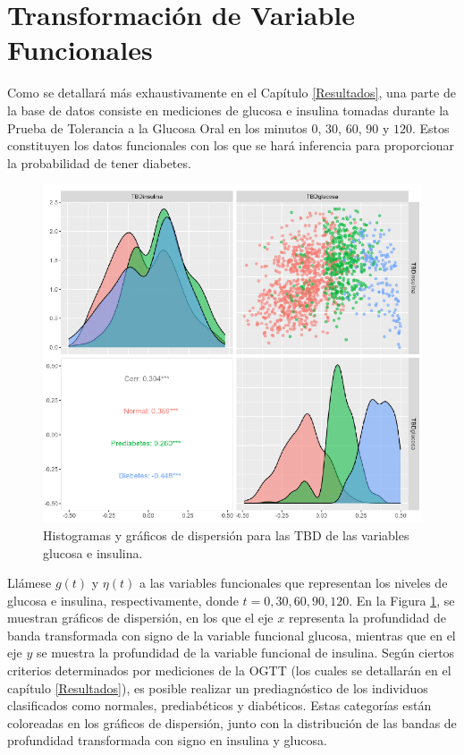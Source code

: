
\section{Transformación de Variable Funcionales}

Como se detallará más exhaustivamente en el Capítulo \ref{Resultados}, una parte de la base de datos consiste en mediciones de glucosa e insulina tomadas durante la Prueba de Tolerancia a la Glucosa Oral en los minutos $0$, $30$, $60$, $90$ y $120$. Estos constituyen los datos funcionales con los que se hará inferencia para proporcionar la probabilidad de tener diabetes. 

\begin{figure}[H]
    \centering
    \includegraphics[width = 0.7 \textwidth]{Imagenes/pairsTBDS.png}
    \caption{Histogramas y gráficos de dispersión para las TBD de las variables glucosa e insulina.}
    \label{fig:pairsTBD}
\end{figure}

Llámese $g(t)$ y $\eta(t)$ a las variables funcionales que representan los niveles de glucosa e insulina, respectivamente, donde $t = 0, 30, 60, 90, 120$. En la Figura \ref{fig:pairsTBD}, se muestran gráficos de dispersión, en los que el eje $x$ representa la profundidad de banda transformada con signo de la variable funcional glucosa, mientras que en el eje $y$ se muestra la profundidad de la variable funcional de insulina. Según ciertos criterios determinados por mediciones de la OGTT (los cuales se detallarán en el capítulo \ref{Resultados}), es posible realizar un prediagnóstico de los individuos clasificados como normales, prediabéticos y diabéticos. Estas categorías están coloreadas en los gráficos de dispersión, junto con la distribución de las bandas de profundidad transformada con signo en insulina y glucosa.


